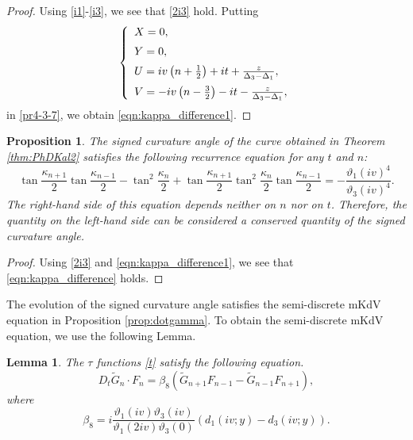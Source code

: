 \documentclass[10pt,leqno]{amsart}
\newtheorem{lem}[theorem]{Lemma}
\newtheorem{prop}[theorem]{Proposition}
\numberwithin{equation}{section}
\begin{document}
\begin{proof}
Using \eqref{i1}-\eqref{i3}, we see that \eqref{2i3} hold. Putting
\begin{eqnarray}\label{pranothermkdv4}
\left\{
\begin{array}{l}
\vspace{2mm}
X=0,\\
\vspace{2mm}
Y=0,\\
\vspace{2mm}
U=iv\left(n+\frac{1}{2}\right)+it+\frac{z}{\Delta_{3}-\Delta_{1}},\\
V=-iv\left(n-\frac{3}{2}\right)-it-\frac{z}{\Delta_{3}-\Delta_{1}},\\
\end{array}
\right.
\end{eqnarray}
in \eqref{pr4-3-7}, we obtain \eqref{eqn:kappa_difference1}. 
\end{proof}
\begin{prop}\label{prop:kappa_difference}
The signed curvature angle of the curve obtained in Theorem \ref{thm:PhDKal2}
satisfies the following recurrence equation for any $t$ and $n$:
\begin{equation}
\tan\frac{\kappa_{n+1}}{2}\tan\frac{\kappa_{n-1}}{2}-\tan^2\frac{\kappa_{n}}{2}+\tan\frac{\kappa_{n+1}}{2}\tan^2\frac{\kappa_{n}}{2}\tan\frac{\kappa_{n-1}}{2}=-\frac{\vartheta_1\left(iv\right)^4}{\vartheta_3\left(iv\right)^4}.\label{eqn:kappa_difference}
\end{equation}
The right-hand side of this equation depends neither on $n$ nor on $t$. Therefore, 
the quantity on the left-hand side can be considered a conserved quantity of the signed curvature angle.
\end{prop}
\begin{proof}
    Using \eqref{2i3} and \eqref{eqn:kappa_difference1}, we see that \eqref{eqn:kappa_difference} holds.
\end{proof}
The evolution of the signed curvature angle satisfies the semi-discrete mKdV equation in Proposition \ref{prop:dotgamma}.
To obtain the semi-discrete mKdV equation, we use the following Lemma.
\begin{lem}\label{prop:anothermkdv1}
The $\tau$ functions \eqref{t} satisfy the following equation.
\begin{equation}\label{anothermkdv3}
D_{t}\widetilde{G}_{n}\cdot F_{n}=\beta_{8}\left(\widetilde{G}_{n+1} F_{n-1}-\widetilde{G}_{n-1}F_{n+1}\right),
\end{equation}
where
\begin{equation}\label{anothermkdv5}
\beta_{8}=i\frac{\vartheta_{1}\left(iv\right)\vartheta_{3}\left(iv\right)}{\vartheta_{1}\left(2iv\right)\vartheta_{3}\left(0\right)}\left(d_{1}(iv;y)-d_{3}(iv;y)\right).
\end{equation}
\end{lem}
\end{document}
